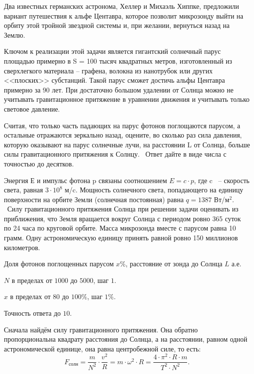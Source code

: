
Два известных
германских астронома, Хеллер и Михаэль Хиппке, предложили
вариант путешествия к альфе Центавра, которое позволит микрозонду выйти
на орбиту этой тройной звездной системы и, при желании, вернуться
назад на Землю.

Ключом к реализации этой задачи является гигантский солнечный парус
площадью примерно в S = 100 тысяч
квадратных метров, изготовленный из сверхлегкого материала – графена,
волокна из нанотрубок или других <<плоских>> субстанций.
Такой парус сможет достичь альфы Центавра примерно за 90 лет. При
достаточно большом удалении от Солнца можно не учитывать гравитационное
притяжение в уравнении движения и учитывать только световое давление.  

Считая, что только часть  падающих на парус фотонов поглощаются парусом, а остальные отражаются зеркально назад, оцените, во сколько раз сила давления, которую оказывают на парус солнечные лучи, на расстоянии L  от Солнца, больше силы гравитационного притяжения к Солнцу.  Ответ дайте в виде числа с точностью до десятков.

Энергия Е и импульс фотона p связаны соотношением $E = c \cdot p$, где c  – скорость света, равная $3 \cdot 10^8$ м/c. Мощность
солнечного света, попадающего на единицу поверхности на орбите Земли (солнечная
постоянная) равна  $q = 1387$ Вт/м$^2$.  Силу гравитационного притяжения Солнца при решении задачи
оценивать из приближения, что Земля вращается вокруг Солнца с периодом ровно
365 суток по 24 часа по круговой орбите. Масса микрозонда вместе с парусом
равна 10 грамм. Одну астрономическую единицу принять равной ровно 150 миллионов
километров.

Доля фотонов поглощенных парусом $x\%$, расстояние от зонда до Солнца $L$ а.е.

\paramSection

$N$ в пределах от $1000$ до $5000$, шаг  $1$.  

$x$ в пределах от $80$ до $100 \%$, шаг  $1 \%$.  

Точность ответа  до  $10$.

\solutionSection

Сначала найдём силу гравитационного притяжения. Она обратно пропорциональна квадрату расстояния до 
Солнца, а на расстоянии, равном одной астрономической единице, она равна центробежной силе, то есть:  
$$F_{\text{солн}}=\frac{m}{N^2}  \cdot \frac{v^2}{R}=m \cdot \omega ^2 \cdot R=\frac{4 \cdot \pi^2 \cdot R \cdot m}{T^2 \cdot N^2}.$$

